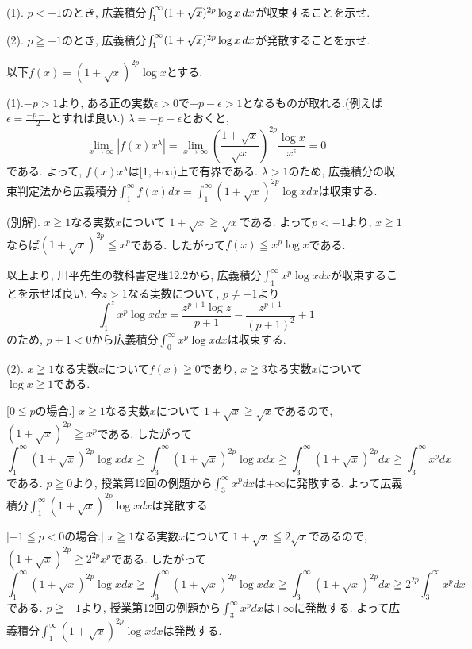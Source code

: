 \documentclass[dvipdfmx,a4paper,11pt]{article}
\theoremstyle{definition}
\begin{document}
{\large(1). $p<-1$のとき, 広義積分$\int_{1}^{\infty} (1+\sqrt{x})^{2p} \log x \text{\,}dx$が収束することを示せ.}

\vspace{11pt}

{\large(2). $p \geqq -1$のとき, 広義積分$\int_{1}^{\infty} (1+\sqrt{x})^{2p} \log x \text{\,}dx$が発散することを示せ.}

 \vspace{11pt}
 
\hspace{-11pt}{\Large $\bullet$ 第6問解答例}

以下$f(x)=(1+\sqrt{x})^{2p} \log x$とする.

(1).$-p > 1$より, ある正の実数$\epsilon >0$で$-p-\epsilon >1$となるものが取れる.(例えば$\epsilon = \frac{-p-1}{2}$とすれば良い.)
$\lambda = -p-\epsilon$とおくと, 
$$
\lim_{x \rightarrow \infty} |f(x) x^{\lambda}| = 
\lim_{x \rightarrow \infty} \left( \frac{1+ \sqrt{x}}{\sqrt{x}} \right)^{2p} \frac{\log x}{x^{\epsilon}} =0$$
である.
よって, $f(x)x^{\lambda}$は$[1,+\infty)$上で有界である.
$\lambda>1$のため, 広義積分の収束判定法から広義積分$\int_{1}^{\infty} f(x)dx=\int_{1}^{\infty} (1+\sqrt{x})^{2p} \log xdx$は収束する.

(別解). $x \geqq 1$なる実数$x$について
$1+ \sqrt{x} \geqq \sqrt{x}$である. よって$p<-1$より, $x \geqq 1$ならば$(1+ \sqrt{x} )^{2p }\leqq x^p$である.
したがって$f(x) \leqq  x^p \log x $である.

以上より, 川平先生の教科書定理12.2から, 広義積分$\int_{1}^{\infty} x^p \log x dx$が収束することを示せば良い.
今$z>1$なる実数について, $p \neq -1$より
$$
\int_{1}^{z} x^p \log x dx =
\frac{z^{p+1}\log z}{p+1} - \frac{z^{p+1}}{(p+1)^2} +1
$$
のため, $p+1<0$から広義積分$\int_{0}^{\infty} x^p \log x dx$は収束する.

(2). $x \geqq 1$なる実数$x$について$f(x) \geqq 0$であり, 
$x \geqq 3$なる実数$x$について$\log x \geqq 1$である.

 [$0 \leqq p$の場合.]
 $x \geqq 1$なる実数$x$について
 $1+ \sqrt{x} \geqq \sqrt{x}$であるので, $(1+ \sqrt{x} )^{2p } \geqq x^p$である.
 したがって
$$
\int_{1}^{\infty} (1+ \sqrt{x} )^{2p } \log xdx
\geqq
\int_{3}^{\infty} (1+ \sqrt{x} )^{2p } \log xdx
\geqq
\int_{3}^{\infty} (1+ \sqrt{x} )^{2p } dx
\geqq
\int_{3}^{\infty} x^p dx
$$
 である. $p \geqq 0$より, 授業第12回の例題から$\int_{3}^{\infty} x^p dx$は$+\infty$に発散する.
 よって広義積分$\int_{1}^{\infty} (1+\sqrt{x})^{2p} \log xdx$は発散する.
 
  [$-1\leqq p <0$の場合.]
 $x \geqq 1$なる実数$x$について
 $1+ \sqrt{x} \leqq 2\sqrt{x}$であるので, $(1+ \sqrt{x} )^{2p } \geqq 2^{2p} x^p$である.
 したがって
$$
\int_{1}^{\infty} (1+ \sqrt{x} )^{2p } \log xdx
\geqq
\int_{3}^{\infty} (1+ \sqrt{x} )^{2p } \log xdx
\geqq
\int_{3}^{\infty} (1+ \sqrt{x} )^{2p } dx
\geqq
2^{2p}\int_{3}^{\infty} x^p dx
$$
 である. $p \geqq -1$より, 授業第12回の例題から$\int_{3}^{\infty} x^p dx$は$+\infty$に発散する.
 よって広義積分$\int_{1}^{\infty} (1+\sqrt{x})^{2p} \log xdx$は発散する.
 
\end{document}

